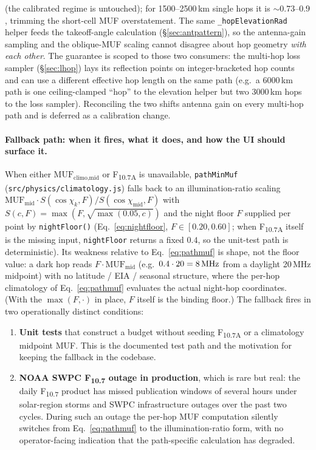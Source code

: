 \documentclass[11pt,a4paper]{article}
\newcommand{\SI}[2]{#1\,\text{#2}}
\newcommand{\MHz}{\text{MHz}}
\begin{document}
(the calibrated regime is untouched); for 1500--2500\,km single
hops it is ${\sim}0.73$--$0.9$, trimming the short-cell MUF
overstatement.  The same \texttt{\_hopElevationRad} helper feeds
the takeoff-angle calculation (\S\ref{sec:antpattern}), so the
antenna-gain sampling and the oblique-MUF scaling cannot disagree
about hop geometry \emph{with each other}.  The guarantee is
scoped to those two consumers: the multi-hop loss sampler
(\S\ref{sec:lhop}) lays its reflection points on
integer-bracketed hop counts and can use a different effective
hop length on the same path (e.g.\ a 6000\,km path is one
ceiling-clamped ``hop'' to the elevation helper but two 3000\,km
hops to the loss sampler).  Reconciling the two shifts antenna
gain on every multi-hop path and is deferred as a calibration
change.

\paragraph{Fallback path: when it fires, what it does, and
how the UI should surface it.}  When either
$\text{MUF}_{\text{climo,mid}}$ or F\textsubscript{10.7A} is
unavailable, \texttt{pathMinMuf} (\texttt{src/physics/climatology.js})
falls back to an illumination-ratio scaling
$\text{MUF}_{\text{mid}} \cdot S(\cos\chi_k, F)/S(\cos\chi_{\text{mid}}, F)$
with $S(c, F) = \max(F, \sqrt{\max(0.05, c)})$ and the night
floor $F$ supplied per point by \texttt{nightFloor()}
(Eq.~\ref{eq:nightfloor}, $F \in [0.20, 0.60]$; when
F\textsubscript{10.7A} itself is the missing input,
\texttt{nightFloor} returns a fixed $0.4$, so the unit-test
path is deterministic).  Its weakness relative to
Eq.~\ref{eq:pathmuf} is shape, not
the floor value: a dark hop reads $F \cdot
\text{MUF}_{\text{mid}}$ (e.g.\ $0.4 \cdot 20 = \SI{8}{\MHz}$
from a daylight 20\,MHz midpoint) with no latitude / EIA /
seasonal structure, where the per-hop climatology of
Eq.~\ref{eq:pathmuf} evaluates the actual night-hop coordinates.
(With the $\max(F, \cdot)$ in place, $F$ itself is the binding
floor.)  The fallback
fires in two operationally distinct conditions:
\begin{enumerate}[nosep]
  \item \textbf{Unit tests} that construct a budget without
        seeding F\textsubscript{10.7A} or a climatology midpoint MUF.
        This is the documented test path and the
        motivation for keeping the fallback in the codebase.
  \item \textbf{NOAA SWPC F\textsubscript{10.7} outage in
        production}, which is rare but real: the daily
        F\textsubscript{10.7} product has missed publication
        windows of several hours under solar-region storms and
        SWPC infrastructure outages over the past two cycles.
        During such an outage the per-hop MUF computation
        silently switches from Eq.~\ref{eq:pathmuf} to the
        illumination-ratio form, with no operator-facing
        indication that the path-specific calculation has
        degraded.
\end{enumerate}
\end{document}
